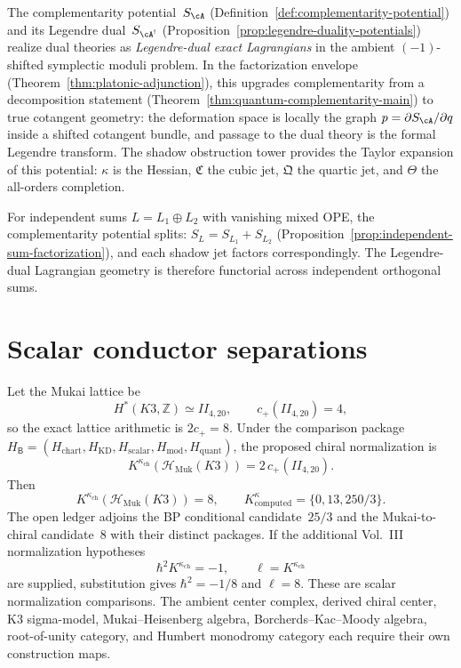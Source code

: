 \begin{remark}
\label{rem:cotangent-geometry-platonic}
The complementarity potential~$S_{\cA}$
(Definition~\ref{def:complementarity-potential}) and its Legendre
dual~$S_{\cA^!}$
(Proposition~\ref{prop:legendre-duality-potentials}) realize dual
theories as \emph{Legendre-dual exact Lagrangians} in the ambient
$(-1)$-shifted symplectic moduli problem. In the factorization
envelope
(Theorem~\ref{thm:platonic-adjunction}), this upgrades
complementarity from a decomposition statement
(Theorem~\ref{thm:quantum-complementarity-main}) to true cotangent
geometry: the deformation space is locally the graph
$p = \partial S_{\cA}/\partial q$ inside a shifted cotangent
bundle, and passage to the dual theory is the formal Legendre
transform. The shadow obstruction tower provides the Taylor expansion of
this potential: $\kappa$ is the Hessian, $\mathfrak{C}$ the
cubic jet, $\mathfrak{Q}$ the quartic jet, and $\Theta$ the
all-orders completion.

For independent sums $L = L_1 \oplus L_2$ with vanishing mixed
OPE, the complementarity potential splits:
$S_L = S_{L_1} + S_{L_2}$
(Proposition~\ref{prop:independent-sum-factorization}),
and each shadow jet factors correspondingly. The Legendre-dual
Lagrangian geometry is therefore functorial across independent
orthogonal sums.
\end{remark}

\section{Scalar conductor separations}
\label{sec:hgc-supplement}

\begin{proposition}
\label{rem:hgc-B-family}
Let the Mukai lattice be
\[
  H^*(K3,\mathbb Z) \simeq II_{4,20},
  \qquad c_+\!\left(II_{4,20}\right)=4,
\]
so the exact lattice arithmetic is $2c_+=8$.  Under the comparison
package
$H_{\mathsf B}=(H_{\mathrm{chart}},H_{\mathrm{KD}},H_{\mathrm{scalar}},
H_{\mathrm{mod}},H_{\mathrm{quant}})$, the proposed chiral normalization is
\[
  K^{\kappa_{\mathrm{ch}}}\!\left(\mathcal H_{\mathrm{Muk}}(K3)\right)
  =2\,c_+\!\left(II_{4,20}\right).
\]
Then
\[
  K^{\kappa_{\mathrm{ch}}}\!\left(\mathcal H_{\mathrm{Muk}}(K3)\right)=8,
  \qquad
  K^\kappa_{\mathrm{computed}}=\{0,13,250/3\}.
\]
The open ledger adjoins the BP conditional candidate~$25/3$ and the
Mukai-to-chiral candidate~$8$ with their distinct packages.  If the
additional Vol.~III normalization hypotheses
\[
  \hbar^2 K^{\kappa_{\mathrm{ch}}}=-1,
  \qquad
  \ell=K^{\kappa_{\mathrm{ch}}}
\]
are supplied, substitution gives $\hbar^2=-1/8$ and $\ell=8$.
These are scalar normalization comparisons.  The ambient center
complex, derived chiral center, K3 sigma-model, Mukai--Heisenberg
algebra, Borcherds--Kac--Moody algebra, root-of-unity category, and
Humbert monodromy category each require their own construction maps.
\end{proposition}

